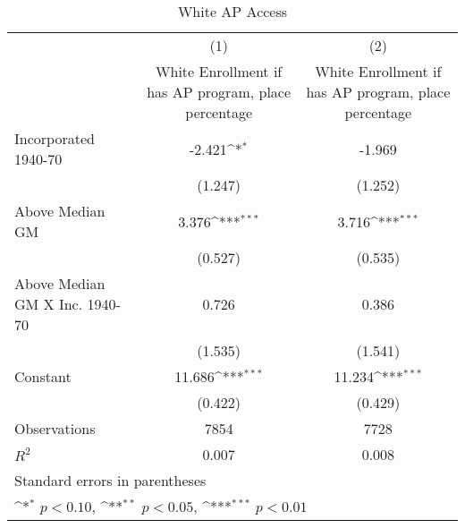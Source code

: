 \begin{table}[htbp]\centering
\def\sym#1{\ifmmode^{#1}\else\(^{#1}\)\fi}
\caption{White AP Access}
\begin{tabular}{l*{2}{c}}
\hline\hline
                    &\multicolumn{1}{c}{(1)}&\multicolumn{1}{c}{(2)}\\
                    &\multicolumn{1}{c}{White Enrollment if has AP program, place percentage}&\multicolumn{1}{c}{White Enrollment if has AP program, place percentage}\\
\hline
Incorporated 1940-70&      -2.421\sym{*}  &      -1.969         \\
                    &     (1.247)         &     (1.252)         \\
[1em]
Above Median GM     &       3.376\sym{***}&       3.716\sym{***}\\
                    &     (0.527)         &     (0.535)         \\
[1em]
Above Median GM X Inc. 1940-70&       0.726         &       0.386         \\
                    &     (1.535)         &     (1.541)         \\
[1em]
Constant            &      11.686\sym{***}&      11.234\sym{***}\\
                    &     (0.422)         &     (0.429)         \\
\hline
Observations        &        7854         &        7728         \\
\(R^{2}\)           &       0.007         &       0.008         \\
\hline\hline
\multicolumn{3}{l}{\footnotesize Standard errors in parentheses}\\
\multicolumn{3}{l}{\footnotesize \sym{*} \(p<0.10\), \sym{**} \(p<0.05\), \sym{***} \(p<0.01\)}\\
\end{tabular}
\end{table}
